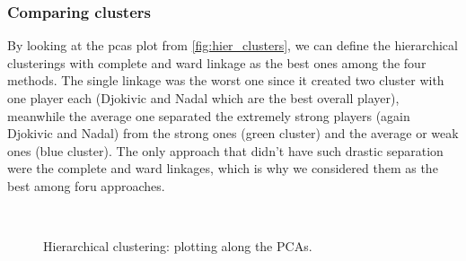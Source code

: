\subsubsection{Comparing clusters}
By looking at the pcas plot from \autoref{fig:hier_clusters}, we can define the hierarchical clusterings with complete and ward linkage as the best ones among the four methods. The single linkage was the worst one since it created two cluster with one player each (Djokivic and Nadal which are the best overall player), meanwhile the average one separated the extremely strong players (again Djokivic and Nadal) from the strong ones (green cluster) and the average or weak ones (blue cluster). The only approach that didn't have such drastic separation were the complete and ward linkages, which is why we considered them as the best among foru approaches.
\begin{figure}[H]
    \centering
    \\
    \caption{Hierarchical clustering: plotting along the PCAs.}
    \label{fig:hier_clusters}
\end{figure}

